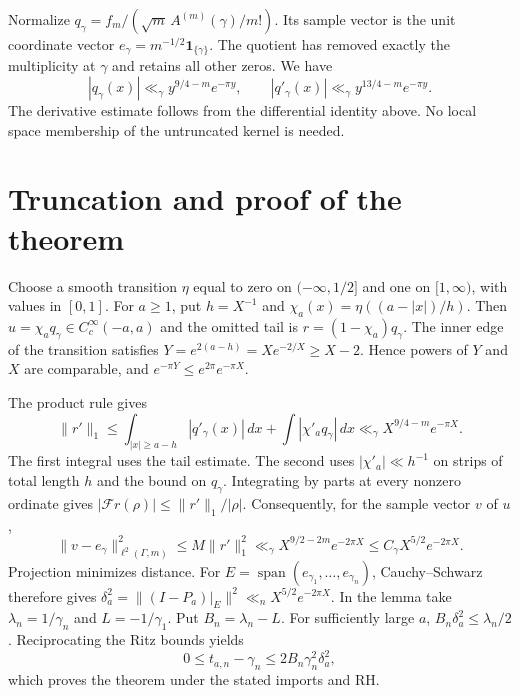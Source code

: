 \documentclass[11pt]{article}
\newcommand{\F}{\mathcal F}
\newcommand{\norm}[1]{\lVert#1\rVert}
\begin{document}
Normalize $q_\gamma=f_m/(\sqrt m\,A^{(m)}(\gamma)/m!)$. Its sample vector is the unit coordinate vector $e_\gamma=m^{-1/2}\mathbf1_{\{\gamma\}}$. The quotient has removed exactly the multiplicity at $\gamma$ and retains all other zeros. We have
\[
|q_\gamma(x)|\ll_\gamma y^{9/4-m}e^{-\pi y},\qquad
|q'_\gamma(x)|\ll_\gamma y^{13/4-m}e^{-\pi y}.
\]
The derivative estimate follows from the differential identity above. No local space membership of the untruncated kernel is needed.
\section{Truncation and proof of the theorem}
Choose a smooth transition $\eta$ equal to zero on $(-\infty,1/2]$ and one on $[1,\infty)$, with values in $[0,1]$. For $a\ge1$, put $h=X^{-1}$ and $\chi_a(x)=\eta((a-|x|)/h)$. Then $u=\chi_a q_\gamma\in C_c^\infty(-a,a)$ and the omitted tail is $r=(1-\chi_a)q_\gamma$. The inner edge of the transition satisfies $Y=e^{2(a-h)}=Xe^{-2/X}\ge X-2$. Hence powers of $Y$ and $X$ are comparable, and $e^{-\pi Y}\le e^{2\pi}e^{-\pi X}$.

The product rule gives
\[
\norm{r'}_1\le\int_{|x|\ge a-h}|q'_\gamma(x)|\,dx+\int|\chi'_a q_\gamma|\,dx
\ll_\gamma X^{9/4-m}e^{-\pi X}.
\]
The first integral uses the tail estimate. The second uses $|\chi'_a|\ll h^{-1}$ on strips of total length $h$ and the bound on $q_\gamma$. Integrating by parts at every nonzero ordinate gives $|\F r(\rho)|\le\norm{r'}_1/|\rho|$. Consequently, for the sample vector $v$ of $u$,
\[
\norm{v-e_\gamma}_{\ell^2(\Gamma,m)}^2\le M\norm{r'}_1^2
\ll_\gamma X^{9/2-2m}e^{-2\pi X}\le C_\gamma X^{5/2}e^{-2\pi X}.
\]
Projection minimizes distance. For $E=\operatorname{span}(e_{\gamma_1},\ldots,e_{\gamma_n})$, Cauchy--Schwarz therefore gives $\delta_a^2=\norm{(I-P_a)|_E}^2\ll_n X^{5/2}e^{-2\pi X}$. In the lemma take $\lambda_n=1/\gamma_n$ and $L=-1/\gamma_1$. Put $B_n=\lambda_n-L$. For sufficiently large $a$, $B_n\delta_a^2\le\lambda_n/2$. Reciprocating the Ritz bounds yields
\[
0\le t_{a,n}-\gamma_n\le 2B_n\gamma_n^2\delta_a^2,
\]
which proves the theorem under the stated imports and RH.
\end{document}

